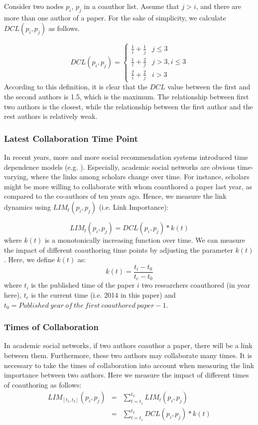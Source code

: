 \documentclass[10pt,journal,compsoc]{IEEEtran}
\begin{document}
Consider two nodes $p_{i}$, $p_{j}$ in a coauthor list. Assume that $j > i$, and there are more than one author of a paper. For the sake of simplicity, we calculate $DCL(p_{i}, p_{j})$ as follows.

\begin{equation}
DCL(p_{i}, p_{j})=\left\{\begin{array}{ll}
\frac{1}{i}+\frac{1}{j} & j\leq 3\\
\frac{1}{i}+\frac{2}{j} & j>3, i\leq 3\\
\frac{2}{i}+\frac{2}{j} & i>3
\end{array}\right.
\end{equation}
According to this definition, it is clear that the $DCL$ value between the first and the second authors is 1.5, which is the maximum. The relationship between first two authors is the closest, while the relationship between the first author and the rest authors is relatively weak.

\subsubsection{Latest Collaboration Time Point}
In recent years, more and more social recommendation systems introduced time dependence models (e.g. \cite{toscher2009bigchaos}). Especially, academic social networks are obvious time-varying, where the links among scholars change over time. For instance, scholars might be more willing to collaborate with whom coauthored a paper last year, as compared to the co-authors of ten years ago. Hence, we measure the link dynamics using $LIM_{t}(p_{i}, p_{j})$ (i.e. Link Importance):

\begin{equation}
LIM_{t}(p_{i}, p_{j})=DCL(p_{i}, p_{j})\ast k(t)
\end{equation}
where $k(t)$ is a monotonically increasing function over time. We can measure the impact of different coauthoring time points by adjusting the parameter $k(t)$. Here, we define $k(t)$ as:
\begin{equation}
k(t)=\frac{t_{i}-t_{0}}{t_{c}-t_{0}}
\end{equation}
where $t_{i}$ is the published time of the paper $i$ two researchers coauthored (in year here), $t_{c}$ is the current time (i.e. 2014 in this paper) and $t_{0}=Published\ year\ of\ the\ first\ coauthored\ paper-1$.

\subsubsection{Times of Collaboration}
In academic social networks, if two authors coauthor a paper, there will be a link between them. Furthermore, these two authors may collaborate many times. It is necessary to take the times of collaboration into account when measuring the link importance between two authors. Here we measure the impact of different times of coauthoring as follows:
\begin{eqnarray}
LIM_{[t_{1}, t_{2}]}(p_{i}, p_{j})&=&\sum_{t=t_{1}}^{t_{2}}LIM_{t}(p_{i}, p_{j}) \nonumber\\
                       &=&\sum_{t=t_{1}}^{t_{2}}DCL(p_{i}, p_{j})\ast k(t)
\end{eqnarray}
\end{document}
